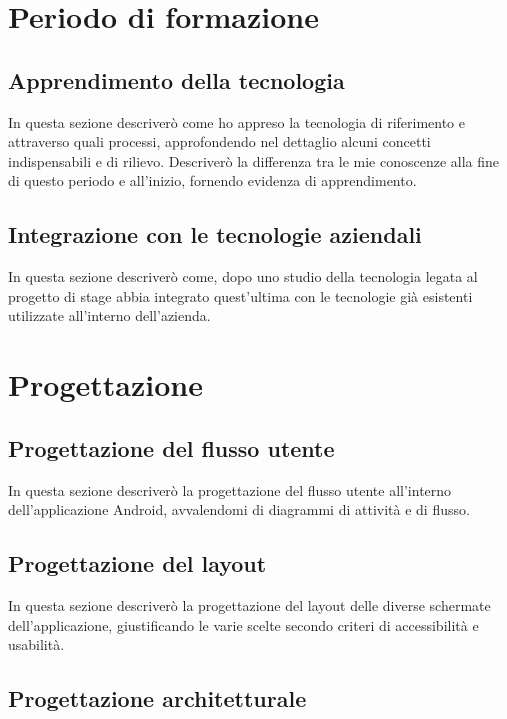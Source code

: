 \section{Periodo di formazione}

\subsection{Apprendimento della tecnologia}

In questa sezione descriverò come ho appreso la tecnologia di riferimento e attraverso quali processi, approfondendo nel dettaglio alcuni concetti indispensabili e di rilievo. Descriverò la differenza tra le mie conoscenze alla fine di questo periodo e all'inizio, fornendo evidenza di apprendimento.

\subsection{Integrazione con le tecnologie aziendali}

In questa sezione descriverò come, dopo uno studio della tecnologia legata al progetto di stage abbia integrato quest'ultima con le tecnologie già esistenti utilizzate all'interno dell'azienda.

\section{Progettazione}

\subsection{Progettazione del flusso utente}

In questa sezione descriverò la progettazione del flusso utente all'interno dell'applicazione Android, avvalendomi di diagrammi di attività e di flusso.

\subsection{Progettazione del layout}

In questa sezione descriverò la progettazione del layout delle diverse schermate dell'applicazione, giustificando le varie scelte secondo criteri di accessibilità e usabilità.

\subsection{Progettazione architetturale}

